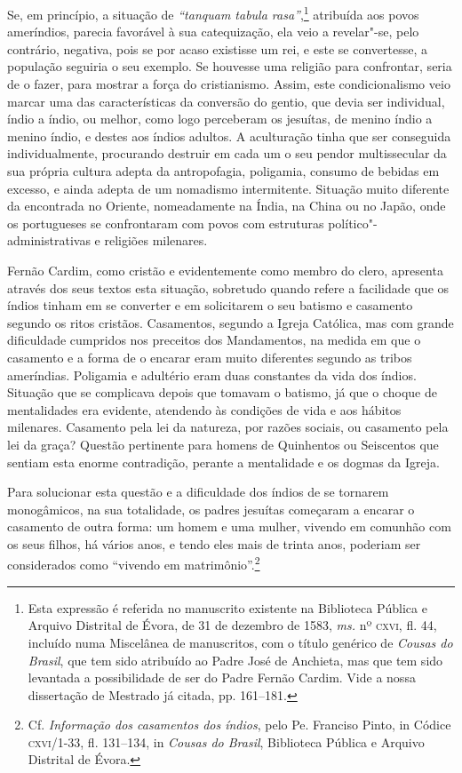 Se, em princípio, a situação de \textit{``tanquam tabula rasa''},\footnote{ Esta 
expressão é referida no manuscrito existente
na Biblioteca Pública e Arquivo Distrital de Évora, de 31 de dezembro
de 1583, \textit{ms.} nº \textsc{cxvi}, fl. 44, incluído numa Miscelânea de
manuscritos, com o título genérico de \textit{Cousas do Brasil}, que
tem sido atribuído ao Padre José de Anchieta, mas que tem sido
levantada a possibilidade de ser do Padre Fernão Cardim. Vide a nossa
dissertação de Mestrado já citada, pp. 161--181.} atribuída
aos povos ameríndios, parecia favorável à sua catequização, ela veio a
revelar"-se, pelo contrário, negativa, pois se por acaso existisse um
rei, e este se convertesse, a população seguiria o seu exemplo. Se
houvesse uma religião para confrontar, seria de o fazer, para mostrar a
força do cristianismo. Assim, este condicionalismo veio marcar uma das
características da conversão do gentio, que devia ser individual, índio
a índio, ou melhor, como logo perceberam os jesuítas, de menino índio
a menino índio, e destes aos índios adultos. A aculturação tinha que
ser conseguida individualmente, procurando destruir em cada um o seu
pendor multissecular da sua própria cultura adepta da antropofagia,
poligamia, consumo de bebidas em excesso, e ainda adepta de um
nomadismo intermitente. Situação muito diferente da encontrada no
Oriente, nomeadamente na Índia, na China ou no Japão, onde os
portugueses se confrontaram com povos com estruturas
político"-administrativas e religiões milenares. 

Fernão Cardim, como cristão e evidentemente como membro do clero,
apresenta através dos seus textos esta situação, sobretudo quando
refere a facilidade que os índios tinham em se converter e em
solicitarem o seu batismo e casamento segundo os ritos cristãos.
Casamentos, segundo a Igreja Católica, mas com grande dificuldade
cumpridos nos preceitos dos Mandamentos, na medida em que o casamento e
a forma de o encarar eram muito diferentes segundo as tribos ameríndias.
Poligamia e adultério eram duas constantes da vida dos índios. Situação
que se complicava depois que tomavam o batismo, já que o choque de
mentalidades era evidente, atendendo às condições de vida e aos hábitos
milenares. Casamento pela lei da natureza, por razões sociais, ou
casamento pela lei da graça? Questão pertinente para homens de
Quinhentos ou Seiscentos que sentiam esta enorme contradição, perante
a mentalidade e os dogmas da Igreja.

Para solucionar esta questão e a dificuldade dos índios de se
tornarem monogâmicos, na sua totalidade, os padres jesuítas começaram a
encarar o casamento de outra forma: um homem e uma mulher, vivendo em
comunhão com os seus filhos, há vários anos, e tendo eles mais de trinta anos, 
poderiam ser considerados como ``vivendo em matrimônio''.\footnote{ Cf. \textit{Informação
dos casamentos dos índios}, pelo Pe. Franciso Pinto, in Códice
\textsc{cxvi}/1-33, fl. 131--134, in \textit{Cousas do Brasil}, Biblioteca
Pública e Arquivo Distrital de Évora.} 

